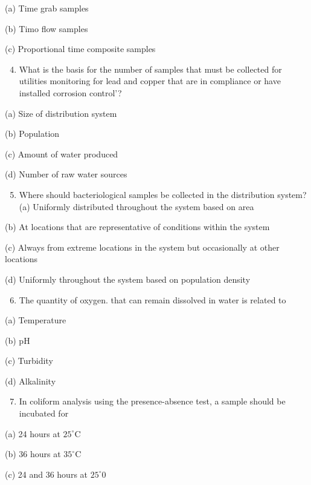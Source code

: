 \documentclass[10pt]{article}
\begin{document}
(a) Time grab samples

(b) Timo flow samples

(c) Proportional time composite samples

\begin{enumerate}
  \setcounter{enumi}{3}
  \item What is the basis for the number of samples that must be collected for utilities monitoring for lead and copper that are in compliance or have installed corrosion control'?
\end{enumerate}

(a) Size of distribution system

(b) Population

(c) Amount of water produced

(d) Number of raw water sources

\begin{enumerate}
  \setcounter{enumi}{4}
  \item Where should bacteriological samples be collected in the distribution system? (a) Uniformly distributed throughout the system based on area
\end{enumerate}

(b) At locations that are representative of conditions within the system

(c) Always from extreme locations in the system but occasionally at other locations

(d) Uniformly throughout the system based on population density

\begin{enumerate}
  \setcounter{enumi}{5}
  \item The quantity of oxygen. that can remain dissolved in water is related to
\end{enumerate}

(a) Temperature

(b) $\mathrm{pH}$

(c) Turbidity

(d) Alkalinity

\begin{enumerate}
  \setcounter{enumi}{6}
  \item In coliform analysis using the presence-absence test, a sample should be incubated for
\end{enumerate}

(a) 24 hours at $25^{\circ} \mathrm{C}$

(b) 36 hours at $35^{\circ} \mathrm{C}$

(c) 24 and 36 hours at $25^{\circ} 0$
\end{document}
